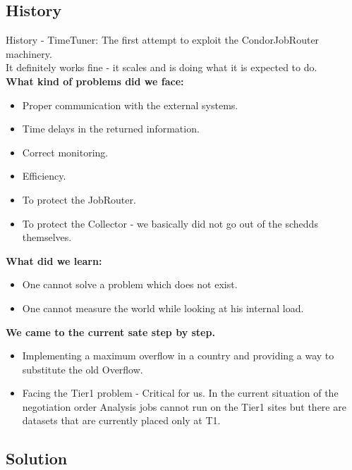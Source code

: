 \documentclass[8pt,mathserif,a4paper,oneside,pdf]{beamer}
\begin{document}
\subsection[History]{History}
\begin{frame}[fragile]{History - TimeTuner:}
  The first attempt to exploit the CondorJobRouter machinery.\\
  It definitely works fine - it scales and is doing what it is expected to do.\\
  \textbf{What kind of problems did we face:}
  \begin{itemize}
  \item
    Proper communication with the external systems.
  \item
    Time delays in the returned information.
  \item
    Correct monitoring.
  \item
    Efficiency.
  \item
    To protect the JobRouter.
  \item
    To protect the Collector - we basically did not go out of the schedds themselves.
  \end{itemize}
  \textbf{What did we learn:}
  \begin{itemize}
  \item
    One cannot solve a problem which does not exist.
  \item
    One cannot measure the world while looking at his internal load.
  \end{itemize}
  \textbf{We came to the current sate step by step.}
  \begin{itemize}
  \item
    Implementing a maximum overflow in a country and providing a way to substitute the old Overflow.
  \item
    Facing the Tier1 problem - Critical for us. In the current situation of the negotiation order Analysis jobs cannot
    run on the Tier1 sites but there are datasets that are currently placed only at T1.
  \end{itemize}
\end{frame}

\subsection[Current Implementation]{Solution}
\end{document}
